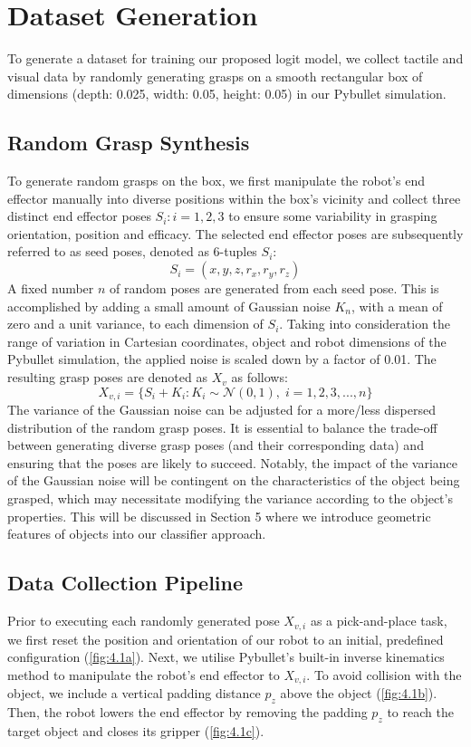 \documentclass[11pt, a4paper]{report}
\begin{document}
\newpage
\section{Dataset Generation}
\label{sec:4.2}
To generate a dataset for training our proposed logit model, we collect tactile and visual data by randomly generating grasps on a smooth rectangular box of dimensions (depth: 0.025, width: 0.05, height: 0.05) in our Pybullet simulation.


\subsection{Random Grasp Synthesis}
\label{sec:4.2.1}
To generate random grasps on the box, we first manipulate the robot's end effector manually into diverse positions within the box's vicinity and collect three distinct end effector poses $S_i:i=1,2,3$ to ensure some variability in grasping orientation, position and efficacy. The selected end effector poses are subsequently referred to as seed poses, denoted as 6-tuples $S_i$:
\begin{equation}
    S_i=(x,y,z,r_x,r_y,r_z)
\end{equation}
A fixed number $n$ of random poses are generated from each seed pose. This is accomplished by adding a small amount of Gaussian noise $K_n$, with a mean of zero and a unit variance, to each dimension of $S_i$. Taking into consideration the range of variation in Cartesian coordinates, object and robot dimensions of the Pybullet simulation, the applied noise is scaled down by a factor of 0.01. The resulting grasp poses are denoted as $X_v$ as follows:
\begin{equation}
    X_{v,i}=\Big\{S_i+K_i:K_i\sim\mathcal{N}(0,1),\;i=1,2,3,...,n\Big\}
\end{equation}
The variance of the Gaussian noise can be adjusted for a more/less dispersed distribution of the random grasp poses. It is essential to balance the trade-off between generating diverse grasp poses (and their corresponding data) and ensuring that the poses are likely to succeed. Notably, the impact of the variance of the Gaussian noise will be contingent on the characteristics of the object being grasped, which may necessitate modifying the variance according to the object's properties. This will be discussed in Section 5 where we introduce geometric features of objects into our classifier approach.
 

\subsection{Data Collection Pipeline}
\label{sec:4.2.2}
Prior to executing each randomly generated pose $X_{v,i}$ as a pick-and-place task, we first reset the position and orientation of our robot to an initial, predefined configuration (\ref{fig:4.1a}). Next, we utilise Pybullet's built-in inverse kinematics method to manipulate the robot's end effector to $X_{v,i}$. To avoid collision with the object, we include a vertical padding distance $p_z$ above the object (\ref{fig:4.1b}). Then, the robot lowers the end effector by removing the padding $p_z$ to reach the target object and closes its gripper (\ref{fig:4.1c}).
\end{document}
